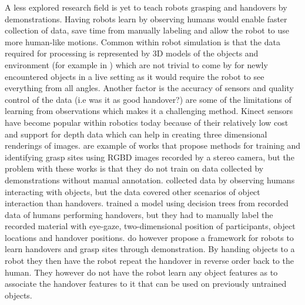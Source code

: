 A less explored research field is yet to teach robots grasping and handovers by demonstrations. Having robots learn by observing humans would enable faster collection of data, save time from manually labeling and allow the robot to use more human-like motions. Common within robot simulation is that the data required for processing is represented by 3D models of the objects and environment (for example in \parencite{Miller2003}) which are not trivial to come by for newly encountered objects in a live setting as it would require the robot to see everything from all angles. Another factor is the accuracy of sensors and quality control of the data (i.e was it as good handover?) are some of the limitations of learning from observations which makes it a challenging method. Kinect sensors have become popular within robotics today because of their relatively low cost and support for depth data which can help in creating three dimensional renderings of images. \parencite{Lenz2015} \parencite{Redmon2014} \parencite{Jiang2011} \parencite{Saxena2008} are example of works that propose methods for training and identifying grasp sites using RGBD images recorded by a stereo camera, but the problem with these works is that they do not train on data collected by demonstrations without manual annotation. \textcite{Chan2014} collected data by observing humans interacting with objects, but the data covered other scenarios of object interaction than handovers. \textcite{Strabala2013} trained a model using decision trees from recorded data of humans performing handovers, but they had to manually label the recorded material with eye-gaze, two-dimensional position of participants, object locations and handover positions. \textcite{Chan2015a} do however propose a framework for robots to learn handovers and grasp sites through demonstration. By handing objects to a robot they then have the robot repeat the handover in reverse order back to the human. They however do not have the robot learn any object features as to associate the handover features to it that can be used on previously untrained objects.

